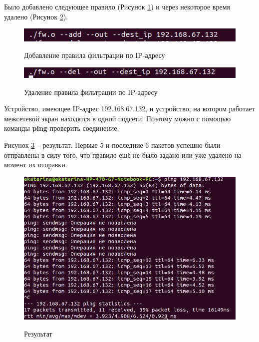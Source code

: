Было добавлено следующее правило (Рисунок \ref{fig46:image}) и через некоторое время удалено (Рисунок \ref{fig47:image}). 

\begin{figure}[h]
	\begin{center}
		{\includegraphics[scale = 0.6]{img/screenshots/ip/add_rule.png}}
		\caption{Добавление правила фильтрации по IP-адресу}
		\label{fig46:image}
	\end{center}
\end{figure}

\begin{figure}[h]
	\begin{center}
		{\includegraphics[scale = 0.6]{img/screenshots/ip/del_rule.png}}
		\caption{Удаление правила фильтрации по IP-адресу}
		\label{fig47:image}
	\end{center}
\end{figure}

\newpage

Устройство, имеющее IP-адрес 192.168.67.132, и устройство, на котором работает межсетевой экран находятся в одной подсети. Поэтому можно с помощью команды \textbf{ping} проверить соединение.

Рисунок \ref{fig48:image} -- результат. Первые 5 и последние 6 пакетов успешно были отправлены в силу того, что правило ещё не было задано или уже удалено на момент их отправки.
\begin{figure}[h]
	\begin{center}
		{\includegraphics[scale = 0.5]{img/screenshots/ip/result.png}}
		\caption{Результат}
		\label{fig48:image}
	\end{center}
\end{figure}

